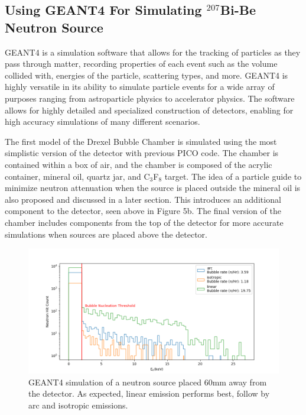 \documentclass[%
12pt,
twoside,
reprint,
amsmath,amssymb,
aps,
]{article}
\begin{document}
	\subsection{Using GEANT4 For Simulating $^{207}$Bi-Be Neutron Source} 
	\par GEANT4 is a simulation software that allows for the tracking of particles as they pass through matter, recording properties of each event such as the volume collided with, energies of the particle, scattering types, and more. GEANT4 is highly versatile in its ability to simulate particle events for a wide array of purposes ranging from astroparticle physics to accelerator physics. The software allows for highly detailed and specialized construction of detectors, enabling for high accuracy simulations of many different scenarios.
	\par The first model of the Drexel Bubble Chamber is simulated using the most simplistic version of the detector with previous PICO code. The chamber is contained within a box of air, and the chamber is composed of the acrylic container, mineral oil, quartz jar, and C$_{3}$F$_{8}$ target. The idea of a particle guide to minimize neutron attenuation when the source is placed outside the mineral oil is also proposed and discussed in a later section. This introduces an additional component to the detector, seen above in Figure 5b. The final version of the chamber includes components from the top of the detector for more accurate simulations when sources are placed above the detector.
	\begin{figure}[!b]
		\includegraphics[scale = 0.6, center]{Images/emission_log.png}
		\caption{\label{tab:table-name} GEANT4 simulation of a neutron source placed 60mm away from the detector. As expected, linear emission performs best, follow by arc and isotropic emissions.}
	\end{figure}
\end{document}
